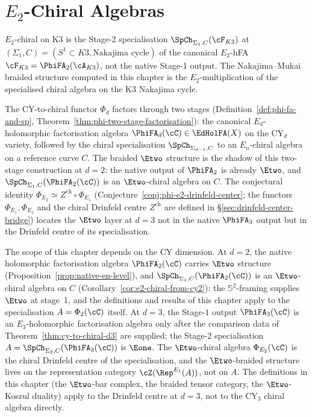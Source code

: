 \providecommand{\fZ}{\mathfrak{Z}}%

\chapter{\texorpdfstring{$E_2$}{E-2}-Chiral Algebras}
\label{ch:e2-chiral}

\begin{remark}
\label{rem:e2-chiral-stage2-shadow}
$E_2$-chiral on K3 is the Stage-2 specialisation
$\SpCh_{\Sigma_1, C}(\cF_{K3})$ at $(\Sigma_1, C) = (S^1 \subset K3,
\text{Nakajima cycle})$ of the canonical $E_2$-hFA
$\cF_{K3} = \PhiFA_2(\cA_{K3})$, not the native Stage-1 output.
The Nakajima--Mukai braided structure computed in this chapter is the
$E_2$-multiplication of the specialised chiral algebra on the K3
Nakajima cycle.
\end{remark}

The CY-to-chiral functor $\Phi_d$ factors through two stages
(Definition~\ref{def:phi-fa-and-sp}, Theorem~\ref{thm:phi-two-stage-factorisation}):
the canonical $E_d$-holomorphic factorisation algebra
$\PhiFA_d(\cC) \in \EdHolFA(X)$
on the CY$_d$ variety, followed by the chiral specialisation
$\SpCh_{\Sigma_{d-1}, C}$ to an $E_n$-chiral algebra on a reference curve $C$.
The braided $\Etwo$ structure is the shadow of this two-stage construction
at $d = 2$: the native output of $\PhiFA_2$ is already $\Etwo$, and
$\SpCh_{\Sigma_1, C}(\PhiFA_2(\cC))$ is an $\Etwo$-chiral algebra on $C$.
The conjectural identity $\Phi_{E_2} \simeq Z^{\mathrm{ch}} \circ \Phi_{E_1}$
\textup{(}Conjecture~\ref{conj:phi-e2-drinfeld-center}; the functors
$\Phi_{E_1}, \Phi_{E_2}$ and the chiral Drinfeld centre $Z^{\mathrm{ch}}$
are defined in \S\textup{\ref{sec:drinfeld-center-bridge}}\textup{)} locates
the $\Etwo$ layer at $d = 3$ not in the native $\PhiFA_3$ output but in the
Drinfeld centre of its specialisation.

The scope of this chapter depends on the CY dimension.
At $d = 2$, the native holomorphic factorisation algebra $\PhiFA_2(\cC)$
carries $\Etwo$ structure (Proposition~\ref{prop:native-en-level}), and
$\SpCh_{\Sigma_1, C}(\PhiFA_2(\cC))$ is an $\Etwo$-chiral algebra
on $C$ \textup{(}Corollary~\ref{cor:e2-chiral-from-cy2}\textup{)}: the
$\mathbb{S}^2$-framing supplies $\Etwo$ at stage~1, and the definitions and
results of this chapter apply to the specialisation $A = \Phi_2(\cC)$ itself.
At $d = 3$, the Stage-$1$ output $\PhiFA_3(\cC)$ is an $E_3$-holomorphic
factorisation algebra only after the comparison data of
Theorem~\textup{\ref{thm:cy-to-chiral-d3}} are supplied; the Stage-$2$
specialisation $A=\SpCh_{\Sigma_2,C}(\PhiFA_3(\cC))$ is $\Eone$.
The $\Etwo$-chiral algebra
$\Phi_{E_2}(\cC)$ is the chiral Drinfeld centre of the specialisation, and the $\Etwo$-braided
structure lives on the representation category $\cZ(\Rep^{E_1}(A))$, not
on $A$. The definitions in this chapter (the $\Etwo$-bar complex, the
braided tensor category, the $\Etwo$-Koszul duality) apply to the
Drinfeld centre at $d = 3$, not to the CY$_3$ chiral algebra directly.

